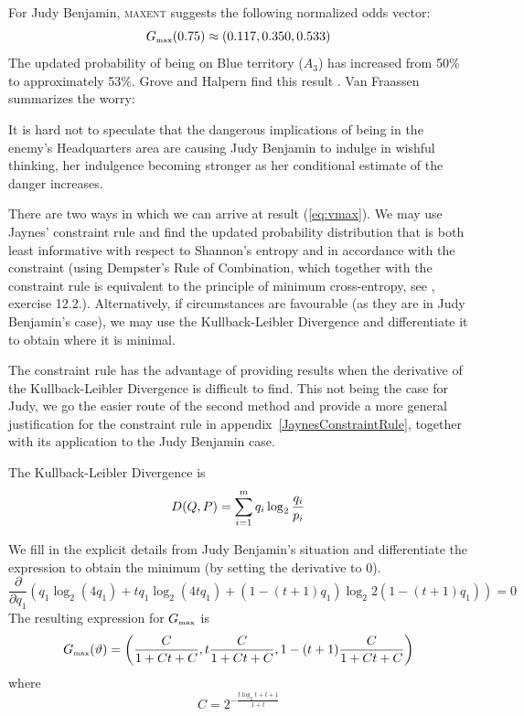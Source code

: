 \documentclass[12pt]{article}
\begin{document}
For Judy Benjamin, \textsc{maxent} suggests the following normalized
odds vector:
\begin{equation}
  \label{eq:vmax}
  G_{\mbox{{\tiny max}}}(0.75)\approx(0.117,0.350,0.533)
\end{equation}
The updated probability of being on Blue territory ($A_{3}$) has
increased from 50\% to approximately 53\%. Grove and Halpern find this
result  .
Van Fraassen summarizes the worry:
\begin{quotex}
  It is hard not to speculate that the dangerous implications of being
  in the enemy's Headquarters area are causing Judy Benjamin to
  indulge in wishful thinking, her indulgence becoming stronger as her
  conditional estimate of the danger increases. 
\end{quotex}

\bigskip

\nial There are two ways in which we can arrive at result
({\ref{eq:vmax}}). We may use Jaynes' constraint rule and find the
updated probability distribution that is both least informative with
respect to Shannon's entropy and in accordance with the constraint
(using Dempster's Rule of Combination, which together with the
constraint rule is equivalent to the principle of minimum
cross-entropy, see , exercise 12.2.).
Alternatively, if circumstances are favourable (as they are in Judy
Benjamin's case), we may use the Kullback-Leibler Divergence and
differentiate it to obtain where it is minimal.


The constraint rule has the advantage of providing results when the
derivative of the Kullback-Leibler Divergence is difficult to find.
This not being the case for Judy, we go the easier route of the second
method and provide a more general justification for the constraint
rule in appendix~\ref{JaynesConstraintRule}, together with its
application to the Judy Benjamin case.

The Kullback-Leibler Divergence is
\begin{equation}
  D(Q,P)=\sum_{i=1}^{m}q_{i}\log_{2}\frac{q_{i}}{p_{i}}\notag
\end{equation}

We fill in the explicit details from Judy Benjamin's situation and
differentiate the expression to obtain the minimum (by setting the
derivative to $0$). 
\begin{displaymath}
\frac{\partial}{\partial{}q_{1}}(q_{1}\log_{2}(4q_{1})+tq_{1}\log_{2}(4tq_{1})+(1-(t+1)q_{1})\log_{2}2(1-(t+1)q_{1}))=0
\end{displaymath}
The resulting expression for $G_{\mbox{\tiny max}}$ is
\begin{displaymath}
  G_{\mbox{\tiny max}}({\vartheta})=\left(\frac{C}{1+Ct+C},t\frac{C}{1+Ct+C},1-(t+1)\frac{C}{1+Ct+C}\right)
\end{displaymath}
where
\begin{displaymath}
  C=2^{-\frac{t\log_{2}t+t+1}{1+t}}
\end{displaymath}
\end{document}
